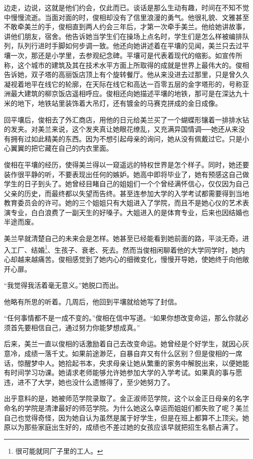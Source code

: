 边走，边说，这就是他们约会，仅此而已。谈话是那么生动有趣，时间在不知不觉中慢慢流逝。当面对面的时，俊相却没有了信里浪漫的勇气。他很礼貌、文雅甚至不敢牵美兰的手，俊相直到两人约会三年后，才第一次牵手美兰。他给她讲故事，讲他们朋友，宿舍。他告诉她当学生们在操场上点名时，学生们是怎么样被编排队列，队列行进时手脚如何步调一致。他还向她讲述着在平壤的见闻，美兰只去过平壤一次，那还是小学里，去参观纪念碑。平壤可是代表着现代的缩影。如宣传所称，这个城市的建筑及其在技术水平方面上所取得的成就是世界上最伟大的。俊相告诉她，双子塔的高丽饭店顶上有个旋转餐厅。他从来没进去过那里，只是曾久久凝视着地平在线它的轮廓，在天际在线它和高达一百零五层的金字塔形的，号称亚洲最大建筑的柳京饭店遥相呼应。俊相还向她描述平壤的地铁，那可是在深达九十米的地下，地铁站里装饰着大吊灯，还有镀金的马赛克拼成的金日成像。

回平壤后，俊相去了外汇商店，用他的日元给美兰买了一个蝴蝶形镶着一排排水钻的发夹。对美兰来说，这个发夹真让她眼花缭乱，又充满异国情调──她还从来没有拥有过如此精美的东西。因为不想引起母亲的询问，她从没有佩戴过它。只是小心翼翼的把它藏在自己的内衣里面。

俊相在平壤的经历，使得美兰得以一窥遥远的特权世界是怎个样子。同时，她还要装作很平静的听，不要表现出任何的嫉妒。她高中即将毕业了，她有预感这自己做学生的日子到头了。她曾经目睹自己的姐姐们一个个曾经满怀信心，仅仅因为自己父亲的历史，而最终都以失望而告终。甚至连参加大学的入学考试都需要得到当地教育委员会的许可。她的三个姐姐只有大姐进入了学院，而且不是她心仪的艺术表演专业，白白浪费了一副天生的好嗓子。大姐进入的是体育专业，后来也因结婚也半途而废。

美兰早就清楚自己的未来会是怎样。她甚至已经能看到她前面的路，平淡无奇。进入工厂、结婚\footnote{很可能就同厂子里的工人。}、生孩子、衰老、死去。然而当俊相闲聊着他的大学同学时，她内心却越来越痛苦。俊相感觉到了她内心的细微变化，慢慢开导她，使她终于向他敞开心扉。

“我觉得我活着毫无意义。”她脱口而出。

他略有所思的听着。几周后，他回到平壤就给她写了封信。

“任何事情都不是一成不变的。”俊相在信中写道。“如果你想改变命运，那么你就必须首先要相信自己，通过努力你能梦想成真。”

后来，美兰一直以俊相的话激励着自己去改变命运。她曾经是个好学生，就因心灰意冷，成绩一落千丈。如果前途渺茫，自暴自弃又有什么区别？但是俊相的一席话，惊醒梦中人。她拾起书本，央求母亲让她从繁重的家务中解脱出来，以便她能有时间学习功课。她请求老师能够允许她参加大学的入学考试。如果真的事与愿违，进不了大学，她也没什么遗憾得了，至少她努力了。

出乎意料的是，她被师范学院录取了。金正淑师范学院，这个以金正日母亲的名字命名的学院是清津最好的师范学院。为什么她这么幸运而姐姐们都失败了呢？美兰自己也觉得奇怪，因为她自认为虽然是属于好学生，但是在班上都算不上顶尖。她原以为那些家庭出生好的，成绩也不差过她的女孩应该早就把招生名额占满了。

